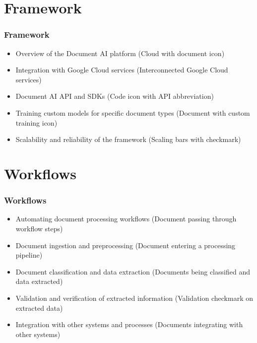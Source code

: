 \section{Framework}

\begin{frame}[fragile]\frametitle{Framework}
  \begin{itemize}
    \item Overview of the Document AI platform (Cloud with document icon)
    \item Integration with Google Cloud services (Interconnected Google Cloud services)
    \item Document AI API and SDKs (Code icon with API abbreviation)
    \item Training custom models for specific document types (Document with custom training icon)
    \item Scalability and reliability of the framework (Scaling bars with checkmark)
  \end{itemize}
\end{frame}

\section{Workflows}

\begin{frame}[fragile]\frametitle{Workflows}
  \begin{itemize}
    \item Automating document processing workflows (Document passing through workflow steps)
    \item Document ingestion and preprocessing (Document entering a processing pipeline)
    \item Document classification and data extraction (Documents being classified and data extracted)
    \item Validation and verification of extracted information (Validation checkmark on extracted data)
    \item Integration with other systems and processes (Documents integrating with other systems)
  \end{itemize}
\end{frame}

